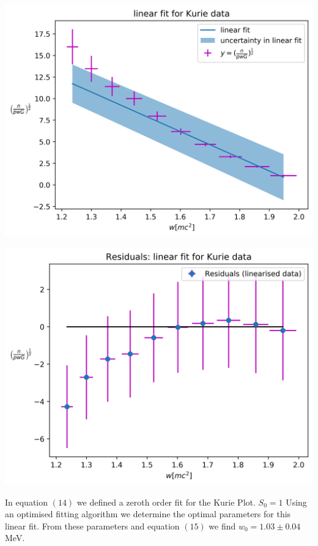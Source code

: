 \documentclass[9pt, a4paper]{article}
\newenvironment{Figure}
    {\par\medskip\noindent\minipage{\linewidth}}
    {\endminipage\par\medskip}
\begin{document}
\begin{multicols}{2}
\begin{Figure}
 \centering
 \includegraphics[width=\linewidth]{Kurie_linear_data_plot.png}
\end{Figure}

\begin{Figure}
 \centering
 \includegraphics[width=\linewidth]{linear_residuals_Kurie_linear_data.png}
\end{Figure}

In equation $(14)$ we defined a zeroth order fit for the Kurie Plot. $S_0 = 1$ 
Using an optimised fitting algorithm we determine the optimal parameters for this linear fit.
From these parameters and equation $(15)$ we find $w_0 = 1.03 \pm 0.04$ MeV.


\end{multicols}
\end{document}
